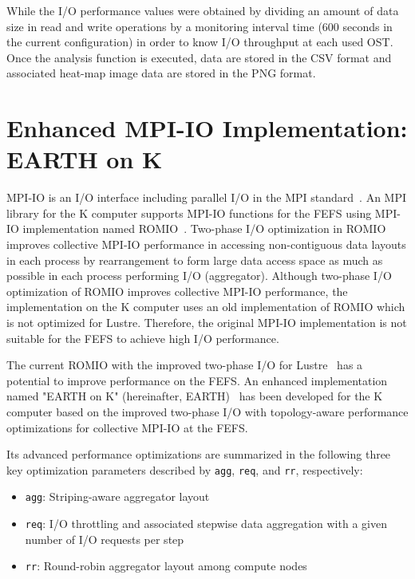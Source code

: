\documentclass{jhps}
\begin{document}
While the I/O performance values were obtained by dividing an amount of data size
in read and write operations by a monitoring
interval time (600 seconds in the current configuration) in order to know
I/O throughput at each used OST.
Once the analysis function is executed, data are stored in the CSV format
and associated heat-map image data are stored in the PNG format.

\section{Enhanced MPI-IO Implementation: EARTH on K}
\label{sec:EARTH}

MPI-IO is an I/O interface including parallel I/O in the MPI standard~\cite{mpi-forum:web}.
An MPI library for the K computer supports MPI-IO functions for the FEFS
using MPI-IO implementation named ROMIO~\cite{thakur:romio}.
Two-phase I/O optimization in ROMIO
improves collective MPI-IO performance in accessing
non-contiguous data layouts in each process by rearrangement
to form large data access space as much as possible in each process
performing I/O (aggregator).
Although two-phase I/O optimization of ROMIO improves collective MPI-IO performance,
the implementation on the K computer uses an old implementation of ROMIO
which is not optimized for Lustre.
Therefore, the original MPI-IO implementation is not suitable
for the FEFS to achieve high I/O performance.

The current ROMIO with the improved two-phase I/O for Lustre~\cite{lustre-adio:whpaper-2008}
has a potential to improve performance on the FEFS.
An enhanced implementation named "EARTH on K"
(hereinafter, EARTH)~\cite{tsujita:WS_EuroMPI2014,tsujita:hpcasia18}
has been developed for the K computer based on the improved two-phase I/O
with topology-aware performance optimizations for collective MPI-IO at the FEFS.

Its advanced performance optimizations are summarized in the following
three key optimization parameters described by {\tt agg}, {\tt req}, and {\tt rr}, respectively:
%
\begin{itemize}
\item {\tt agg}: Striping-aware aggregator layout
\item {\tt req}: I/O throttling and associated stepwise data aggregation
with a given number of I/O requests per step
\item {\tt rr}: Round-robin aggregator layout among compute nodes
\end{itemize}
%
\end{document}
